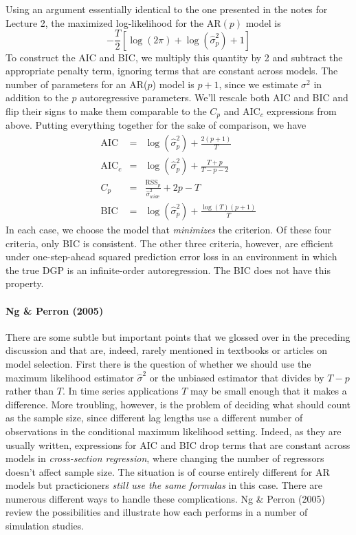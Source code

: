 Using an argument essentially identical to the one presented in the notes for Lecture 2, the maximized log-likelihood for the AR$(p)$ model is
	$$-\frac{T}{2}\left[\log(2\pi) + \log\left(\widehat{\sigma}^2_p \right) + 1\right]$$
To construct the AIC and BIC, we multiply this quantity by 2 and subtract the appropriate penalty term, ignoring terms that are constant across models. The number of parameters for an AR($p$) model is $p+1$, since we estimate $\sigma^2$ in addition to the $p$ autoregressive parameters. We'll rescale both AIC and BIC and flip their signs to make them comparable to the $C_p$ and AIC$_c$ expressions from above. Putting everything together for the sake of comparison, we have
\begin{eqnarray*}
	\mbox{AIC} &=& \log\left(\widehat{\sigma}^2_p \right) + \frac{2(p+1)}{T}\\
	\mbox{AIC}_c &=&  \log\left(\widehat{\sigma}^2_p \right) + \frac{T+p}{T-p-2}\\
	C_p &=&  \frac{\mbox{RSS}_p}{\widehat{\sigma}^2_{wide}} + 2p- T\\
	\mbox{BIC} &=&\log\left(\widehat{\sigma}^2_p \right) + \frac{ \log(T)(p+1)}{T}
\end{eqnarray*}
In each case, we choose the model that \emph{minimizes} the criterion. Of these four criteria, only BIC is consistent. The other three criteria, however, are efficient under one-step-ahead squared prediction error loss in an environment in which the true DGP is an infinite-order autoregression. The BIC does not have this property.


\paragraph{Ng \& Perron (2005)} There are some subtle but important points that we glossed over in the preceding discussion and that are, indeed, rarely mentioned in textbooks or articles on model selection. First there is the question of whether we should use the maximum likelihood estimator $\widehat{\sigma}^2$ or the unbiased estimator that divides by $T-p$ rather than $T$. In time series applications $T$ may be small enough that it makes a difference. More troubling, however, is the problem of deciding what should count as the sample size, since different lag lengths use a different number of observations in the conditional maximum likelihood setting. Indeed, as they are usually written, expressions for AIC and BIC drop terms that are constant across models in \emph{cross-section regression}, where changing the number of regressors doesn't affect sample size. The situation is of course entirely different for AR models but practicioners \emph{still use the same formulas} in this case. There are numerous different ways to handle these complications. Ng \& Perron (2005) review the possibilities and illustrate how each performs in a number of simulation studies.


